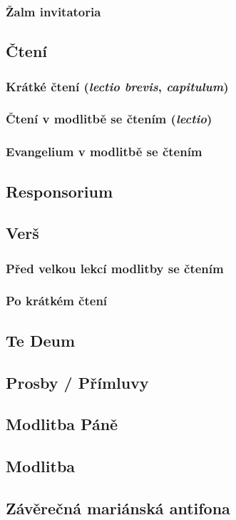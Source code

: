 \subsubsection{Žalm invitatoria}

\subsection{Čtení}
\label{sec:cteni}
\subsubsection{Krátké čtení (\emph{lectio brevis}, \emph{capitulum})}
\subsubsection{Čtení v modlitbě se čtením (\emph{lectio})}
\subsubsection{Evangelium v modlitbě se čtením}

\subsection{Responsorium}
\label{sec:responsorium}

\subsection{Verš}
\label{sec:vers}
\subsubsection{Před velkou lekcí modlitby se čtením}
\subsubsection{Po krátkém čtení}

\subsection{Te Deum}

\subsection{Prosby / Přímluvy}
\label{sec:prosby}

\subsection{Modlitba Páně}
\label{sec:otcenas}

\subsection{Modlitba}
\label{sec:modlitba}

\subsection{Závěrečná mariánská antifona}
\label{sec:mariaantifona}
